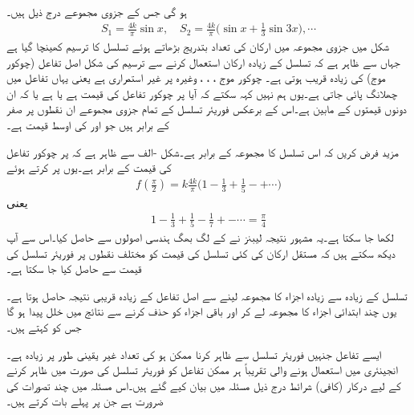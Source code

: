 ہو گی جس کے جزوی مجموعے درج ذیل ہیں۔
\begin{align*}
S_1=\frac{4k}{\pi}\sin x,\quad S_2=\frac{4k}{\pi}\big(\sin x+\frac{1}{3}\sin 3x\big),\cdots
\end{align*}
شکل  میں جزوی مجموعہ میں ارکان کی تعداد بتدریج بڑھاتے ہوئے تسلسل کا ترسیم کھینچا  گیا ہے جہاں سے ظاہر ہے کہ تسلسل کے زیادہ ارکان استعمال کرنے سے  ترسیم کی شکل اصل تفاعل (چوکور موج) کی زیادہ  قریب ہوتی ہے۔ چوکور موج ، ، ، وغیرہ پر غیر استمراری ہے یعنی یہاں تفاعل میں چھلانگ پائی جاتی ہے۔یوں ہم نہیں کہہ سکتے کہ آیا  پر چوکور تفاعل کی قیمت  ہے یا  ہے  یا کہ ان دونوں قیمتوں کے مابین ہے۔اس کے برعکس فوریئر تسلسل کے تمام جزوی مجموعے ان نقطوں پر صفر کے برابر ہیں جو  اور  کی اوسط قیمت ہے۔

مزید فرض کریں کہ اس تسلسل کا مجموعہ  کے برابر ہے۔شکل -الف سے ظاہر ہے کہ  پر چوکور تفاعل کی قیمت  کے برابر ہے۔یوں  پر  کرتے ہوئے
\begin{align*}
f(\frac{\pi}{2})=k\frac{4k}{\pi}\big(1-\frac{1}{3}+\frac{1}{5}-+\cdots\big )
\end{align*}
یعنی
\begin{align}\label{مساوات_فوریئر_لیبنٹز_تعلق}
1-\frac{1}{3}+\frac{1}{5}-\frac{1}{7}+-\cdots=\frac{\pi}{4}
\end{align}
لکھا جا سکتا ہے۔یہ مشہور نتیجہ لیبنز نے  کے لگ بھگ ہندسی اصولوں سے حاصل کیا۔اس سے آپ دیکھ سکتے ہیں کہ مستقل ارکان کی کئی تسلسل کی قیمت کو  مختلف نقطوں پر فوریئر تسلسل کی قیمت سے حاصل کیا جا سکتا ہے۔  

تسلسل کے  زیادہ  سے زیادہ اجزاء کا مجموعہ لینے سے اصل تفاعل کے زیادہ قریبی نتیجہ حاصل ہوتا ہے۔یوں چند ابتدائی اجزاء کا مجموعہ لے کر اور باقی اجزاء کو حذف کرنے سے نتائج میں خلل پیدا ہو گا جس کو  کہتے ہیں۔



ایسے تفاعل جنہیں فوریئر تسلسل سے  ظاہر کرنا ممکن ہو کی تعداد غیر یقینی طور پر زیادہ ہے۔ انجینئری میں استعمال ہونے  والی تقریباً ہر ممکن تفاعل کو فوریئر تسلسل کی صورت میں ظاہر کرنے کے لیے درکار (کافی) شرائط درج ذیل مسئلہ  میں بیان کیے گئے ہیں۔اس مسئلہ میں چند تصورات کی ضرورت ہے جن پر پہلے بات کرتے ہیں۔

